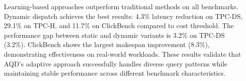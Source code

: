 \documentclass[sigconf, nonacm]{acmart}
\newcommand{\dispatcher}{AQD\xspace}
\begin{document}
\begin{table}[t]
\centering
\caption{Performance on Standard Benchmarks}
\label{tab:benchmark_results}
\vspace{-0.15in}
\end{table}

Learning-based approaches outperform traditional methods on all benchmarks. Dynamic dispatch achieves the best results: 4.3\% latency reduction on TPC-DS, 29.1\% on TPC-H, and 11.7\% on ClickBench compared to cost threshold. The performance gap between static and dynamic variants is 3.2\% on TPC-DS (3.2\%).  ClickBench shows the largest makespan improvement (8.3\%), demonstrating effectiveness on real-world workloads. These results validate that \dispatcher's adaptive approach successfully handles diverse query patterns while maintaining stable performance across different benchmark characteristics.
\end{document}
